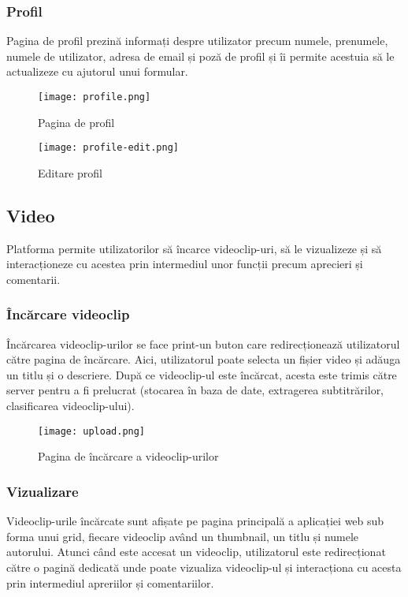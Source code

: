 \subsubsection{Profil}
Pagina de profil prezină informați despre utilizator precum numele, prenumele, numele de utilizator,
adresa de email și poză de profil și îi permite acestuia să le actualizeze cu ajutorul unui formular.

\begin{figure}[h!]
    \centering
    \begin{minipage}{0.49\textwidth}
        \centering
        \texttt{[image: profile.png]}
        \caption{Pagina de profil}
        \label{fig:profile}
    \end{minipage}\hfill
    \begin{minipage}{0.49\textwidth}
        \centering
        \texttt{[image: profile-edit.png]}
        \caption{Editare profil}
        \label{fig:profile-edit}
    \end{minipage}
\end{figure}

\vspace{1em}

\subsection{Video}
Platforma permite utilizatorilor să încarce videoclip-uri, să le vizualizeze și să
interacționeze cu acestea prin intermediul unor funcții precum aprecieri și comentarii.
\subsubsection{Încărcare videoclip}
Încărcarea videoclip-urilor se face print-un buton care redirecționează utilizatorul către
pagina de încărcare. Aici, utilizatorul poate selecta un fișier video și adăuga un titlu și
o descriere. După ce videoclip-ul este încărcat, acesta este trimis către server pentru a fi
prelucrat (stocarea în baza de date, extragerea subtitrărilor, clasificarea videoclip-ului).

\begin{figure}[h]
    \centering
    \texttt{[image: upload.png]}
    \caption{Pagina de încărcare a videoclip-urilor}
    \label{fig:upload}
\end{figure}

\subsubsection{Vizualizare}
Videoclip-urile încărcate sunt afișate pe pagina principală a aplicației web sub forma unui
grid, fiecare videoclip având un thumbnail, un titlu și numele autorului. Atunci când este 
accesat un videoclip, utilizatorul este redirecționat către o pagină dedicată unde poate
vizualiza videoclip-ul și interacționa cu acesta prin intermediul apreriilor și comentariilor.

